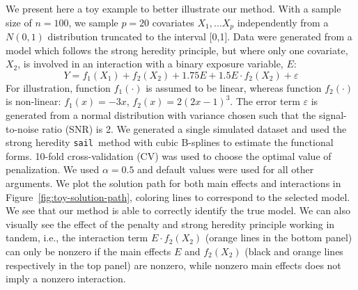\documentclass[12pt,letter]{article}\usepackage[]{graphicx}\usepackage[]{color}
\newcommand{\sail}{\texttt{sail}}
\begin{document}
We present here a toy example to better illustrate our method. With a sample size of $n=100$, we sample $p=20$ covariates $X_1, \ldots X_p$ independently from a $N(0,1)$ distribution truncated to the interval [0,1]. Data were generated from a model which follows the strong heredity principle, but where only one covariate, $X_2$, is involved in an interaction with a binary exposure variable, $E$:
\begin{equation}
	Y = f_1(X_1) + f_2(X_2) + 1.75 E + 1.5 E \cdot f_2(X_2) + \varepsilon
\end{equation}
For illustration, function $f_1(\cdot)$ is assumed to be linear, whereas function $f_2(\cdot)$ is non-linear: $f_1(x) = -3x$, $f_2(x) = 2(2x-1)^3$. The error term $\varepsilon$ is generated from a normal distribution with variance chosen such that the signal-to-noise ratio (SNR) is 2.  We generated a single simulated dataset and used the strong heredity \sail ~method with cubic B-splines to estimate the functional forms. 10-fold cross-validation (CV) was used to choose the optimal value of penalization. We used $\alpha=0.5$ and default values were used for all other arguments. We plot the solution path for both main effects and interactions in Figure~\ref{fig:toy-solution-path}, coloring lines to correspond to the selected model. We see that our method is able to correctly identify the true model. We can also visually see the effect of the penalty and strong heredity principle working in tandem, i.e., the interaction term $E \cdot f_2(X_2)$ (orange lines in the bottom panel) can only be nonzero if the main effects $E$ and $f_2(X_2)$ (black and orange lines respectively in the top panel) are nonzero, while nonzero main effects does not imply a nonzero interaction.
\end{document}
